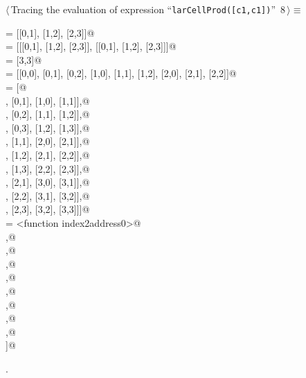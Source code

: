 \documentclass[11pt,oneside]{article}	%
\begin{document}
\begin{flushleft} \small \label{scrap10}
\protect{}$\langle\,$Tracing the evaluation of expression ``\texttt{larCellProd([c1,c1])}''\nobreak\ {\footnotesize 8}$\,\rangle\equiv$
\vspace{-1ex}
\begin{list}{}{} \item
\mbox{} = [[0,1], [1,2], [2,3]]@\\
\mbox{}\verb@cellLists = [[[0,1], [1,2], [2,3]], [[0,1], [1,2], [2,3]]]@\\
\mbox{}\verb@shapes = [3,3]@\\
\mbox{}\verb@indices = [[0,0], [0,1], [0,2], [1,0], [1,1], [1,2], [2,0], [2,1], [2,2]]@\\
\mbox{}\verb@jointCells = [@\\
\mbox{}\verb@ [[0,0], [0,1], [1,0], [1,1]],@\\
\mbox{}\verb@ [[0,1], [0,2], [1,1], [1,2]],@\\
\mbox{}\verb@ [[0,2], [0,3], [1,2], [1,3]],@\\
\mbox{}\verb@ [[1,0], [1,1], [2,0], [2,1]],@\\
\mbox{}\verb@ [[1,1], [1,2], [2,1], [2,2]],@\\
\mbox{}\verb@ [[1,2], [1,3], [2,2], [2,3]],@\\
\mbox{}\verb@ [[2,0], [2,1], [3,0], [3,1]],@\\
\mbox{}\verb@ [[2,1], [2,2], [3,1], [3,2]],@\\
\mbox{}\verb@ [[2,2], [2,3], [3,2], [3,3]]]@\\
\mbox{}\verb@convert = <function index2address0>@\\
\mbox{}\verb@return [@\\
\mbox{}\verb@ [0,1,4,5],@\\
\mbox{}\verb@ [1,2,5,6],@\\
\mbox{}\verb@ [2,3,6,7],@\\
\mbox{}\verb@ [4,5,8,9],@\\
\mbox{}\verb@ [5,6,9,10],@\\
\mbox{}\verb@ [6,7,10,11],@\\
\mbox{}\verb@ [8,9,12,13],@\\
\mbox{}\verb@ [9,10,13,14],@\\
\mbox{}\verb@ [10,11,14,15]]@\\
\mbox{}\verb@@{\NWsep}
\end{list}
\vspace{-1ex}
\footnotesize\addtolength{\baselineskip}{-1ex}
\begin{list}{}{\setlength{\itemsep}{-\parsep}\setlength{\itemindent}{-\leftmargin}}
\item {\NWtxtMacroNoRef}.
\end{list}
\end{flushleft}
\end{document}
